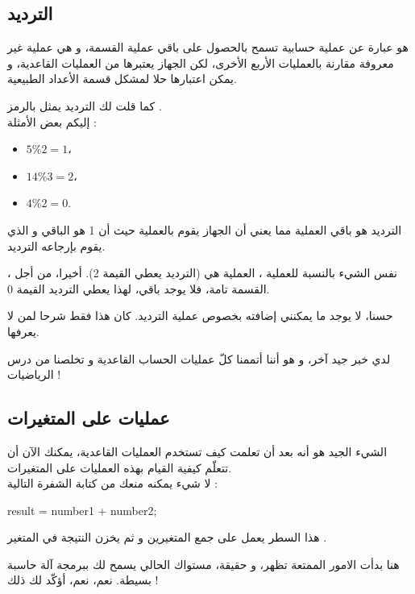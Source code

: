 \subsection{الترديد}

هو عبارة عن عملية حسابية تسمح بالحصول على باقي عملية القسمة، و هي عملية غير معروفة مقارنة بالعمليات الأربع الأخرى، لكن الجهاز يعتبرها من العمليات القاعدية، و يمكن اعتبارها حلا لمشكل قسمة الأعداد الطبيعية.

كما قلت لك الترديد يمثل بالرمز
\InlineCode{\%}.\\
إليكم بعض الأمثلة :

\begin{itemize}
  \item $ 5 \% 2 = 1 $،
  \item $ 14 \% 3 = 2 $،
  \item $ 4 \% 2 = 0 $.
\end{itemize}

الترديد
هو باقي العملية
مما يعني أن الجهاز يقوم بالعملية
حيث أن 1 هو الباقي و الذي يقوم بإرجاعه الترديد.

نفس الشيء بالنسبة للعملية
،
العملية هي
(الترديد يعطي القيمة  2). أخيرا، من أجل
،
القسمة تامة، فلا يوجد باقي، لهذا يعطي الترديد القيمة 0.

حسنا، لا يوجد ما يمكنني إضافته بخصوص عملية الترديد. كان هذا فقط شرحا لمن لا يعرفها.

لدي خبر جيد آخر، و هو أننا أتممنا كلّ عمليات الحساب القاعدية و تخلصنا من درس الرياضيات !

\subsection{عمليات على المتغيرات}

الشيء الجيد هو أنه بعد أن تعلمت كيف تستخدم العمليات القاعدية، يمكنك الآن أن تتعلّم كيفية القيام بهذه العمليات على المتغيرات.\\
لا شيء يمكنه منعك من كتابة الشفرة التالية :

\begin{Csource}
  result = number1 + number2;
\end{Csource}

هذا السطر يعمل على جمع المتغيرين
و
ثم يخزن النتيجة في المتغير
.

هنا بدأت الامور الممتعة تظهر، و حقيقة، مستواك الحالي يسمح لك ببرمجة آلة حاسبة بسيطة. نعم، نعم، أؤكّد لك ذلك !


